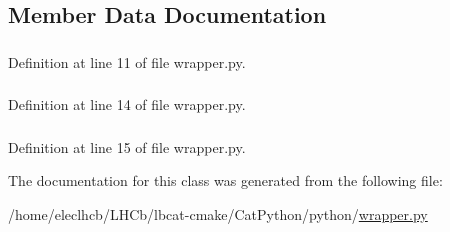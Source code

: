 \subsection{Member Data Documentation}
\hypertarget{classwrapper_1_1wrapper_a258ac98ee9d8cb53ca4ab2bc6fd5f376}{
\subsubsection[{cat}]{}}
\label{classwrapper_1_1wrapper_a258ac98ee9d8cb53ca4ab2bc6fd5f376}


Definition at line 11 of file wrapper.py.\hypertarget{classwrapper_1_1wrapper_af3a640a6e44b97a0a58aaa237fa9311b}{
\subsubsection[{modules}]{}}
\label{classwrapper_1_1wrapper_af3a640a6e44b97a0a58aaa237fa9311b}


Definition at line 14 of file wrapper.py.\hypertarget{classwrapper_1_1wrapper_a9922036691f66285e0eb72d3627d5352}{
\subsubsection[{ok}]{}}
\label{classwrapper_1_1wrapper_a9922036691f66285e0eb72d3627d5352}


Definition at line 15 of file wrapper.py.

The documentation for this class was generated from the following file:\begin{DoxyCompactItemize}
\item 
/home/eleclhcb/LHCb/lbcat-\/cmake/CatPython/python/\hyperlink{wrapper_8py}{wrapper.py}\end{DoxyCompactItemize}
